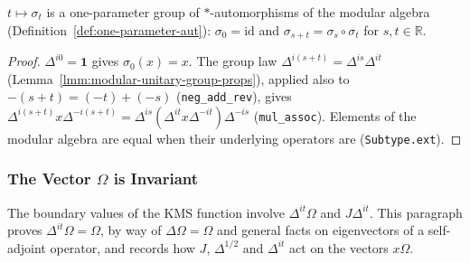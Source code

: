 \begin{lemma}
    \label{lmm:modular-automorphism-one-parameter}
    \leanok
    $t \mapsto \sigma_t$ is a one-parameter group of $*$-automorphisms of the modular algebra (Definition~\ref{def:one-parameter-aut}): $\sigma_0 = \mathrm{id}$ and $\sigma_{s+t} = \sigma_s \circ \sigma_t$ for $s, t \in \mathbb{R}$.
\end{lemma}
\begin{proof}
    \leanok
    $\Delta^{i0} = \mathbf{1}$ gives $\sigma_0(x) = x$. The group law $\Delta^{i(s+t)} = \Delta^{is}\Delta^{it}$ (Lemma~\ref{lmm:modular-unitary-group-props}), applied also to $-(s+t) = (-t) + (-s)$ (\texttt{neg\_add\_rev}), gives $\Delta^{i(s+t)}x\Delta^{-i(s+t)} = \Delta^{is}(\Delta^{it}x\Delta^{-it})\Delta^{-is}$ (\texttt{mul\_assoc}). Elements of the modular algebra are equal when their underlying operators are (\texttt{Subtype.ext}).
\end{proof}

\subsubsection{The Vector $\Omega$ is Invariant}

The boundary values of the KMS function involve $\Delta^{it}\Omega$ and $J\Delta^{it}$. This paragraph proves $\Delta^{it}\Omega = \Omega$, by way of $\Delta\Omega = \Omega$ and general facts on eigenvectors of a self-adjoint operator, and records how $J$, $\Delta^{1/2}$ and $\Delta^{it}$ act on the vectors $x\Omega$.

